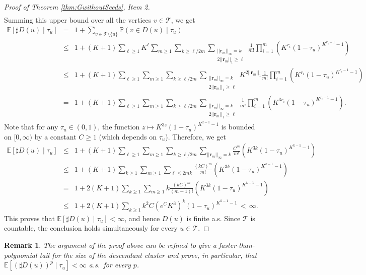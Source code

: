 \documentclass[french]{article}
\newtheorem{remark}[theorem]{Remark}
\newcommand{\E}{\mathbb{E}}
\renewcommand{\P}{\mathbb{P}}
\newcommand{\T}{\mathcal{T}}
\renewcommand{\1}{\mathds{1}}
\begin{document}
\begin{proof}[Proof of Theorem \ref{thm:GwithoutSeeds}, Item 2]
\begin{eqnarray*}
\end{eqnarray*}
Summing this upper bound over all the vertices $v \in \T$, we get
   \begin{eqnarray*}  \E[\sharp D(u)\mid \tau_u]
   &=& 1+\sum_{v\in \T\setminus\{u\}}{\P(v\in D(u)\mid \tau_u)}\\
   &\le & 1+ (K+1)\sum_{\ell \ge 1} K^\ell  \sum_{m\ge 1} \sum_{k\ge \ell/2m}\sum_{\substack{||\mathbf{r}_m||_{\infty}=k \\ 2||\mathbf{r}_m||_{1}\ge \ell}}\frac{1}{m!}\prod_{i=1}^m\left(K^{ r_i}  (1-\tau_u)^{ K^{r_i-1}-1}\right)\\
    &\le & 1+ (K+1)\sum_{\ell \ge 1}   \sum_{m\ge 1} \sum_{k\ge \ell/2m}\sum_{\substack{||\mathbf{r}_m||_{\infty}=k \\ 2||\mathbf{r}_m||_{1}\ge \ell}}K^{2||\mathbf{r}_m||_{1}}\frac{1}{m!}\prod_{i=1}^m\left(K^{ r_i}  (1-\tau_u)^{ K^{r_i-1}-1}\right)\\
    &=& 1+ (K+1)\sum_{\ell \ge 1}   \sum_{m\ge 1} \sum_{k\ge \ell/2m}\sum_{\substack{||\mathbf{r}_m||_{\infty}=k \\ 2||\mathbf{r}_m||_{1}\ge \ell}}\frac{1}{m!}\prod_{i=1}^m\left(K^{ 3r_i}  (1-\tau_u)^{ K^{r_i-1}-1}\right).
\end{eqnarray*}
Note that for any $\tau_u\in (0,1)$, the function $z\mapsto K^{3z}(1-\tau_u)^{K^{z-1}-1}$ is bounded on $[0,\infty)$ by a constant $C\ge 1$ (which depends on $\tau_u$). Therefore, we get
 \begin{eqnarray*}  \E[\sharp D(u)\mid \tau_u]
    &\le & 1+(K+1)\sum_{\ell \ge 1}   \sum_{m\ge 1} \sum_{k\ge \ell/2m}\sum_{||\mathbf{r}_m||_{\infty}=k }\frac{C^m}{m!}\left(K^{ 3k}  (1-\tau_u)^{ K^{k-1}-1}\right)\\
    &\le & 1+(K+1)\sum_{k\ge 1}   \sum_{m\ge 1} \sum_{\ell\le 2mk}\frac{(kC)^m}{m!}\left(K^{ 3k}  (1-\tau_u)^{ K^{k-1}-1}\right)\\
    &= & 1+2(K+1)\sum_{k\ge 1}   \sum_{m\ge 1} k\frac{(kC)^m}{(m-1)!}\left(K^{ 3k}  (1-\tau_u)^{ K^{k-1}-1}\right)\\
     &\le & 1 + 2(K+1)\sum_{k\ge 1}  k^2C\left(e^{C}K^{3}\right)^{k}  (1-\tau_u)^{ K^{k-1}-1}\,<\, \infty.
\end{eqnarray*}
This proves that \(\E[\sharp D(u)\mid \tau_u]<\infty\), and hence \(D(u)\) is finite a.s. Since \(\T\) is countable, the conclusion holds simultaneously for every \(u\in\T\).
\end{proof}

\begin{remark} The argument of the proof above can be refined to give a faster-than-polynomial tail for the size of the descendant cluster and prove, in particular, that $\E[(\sharp D(u))^p\mid \tau_u]<\infty$ a.s.\ for every $p$.
\end{remark}
\end{document}
